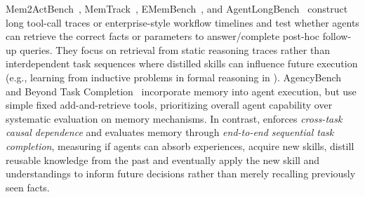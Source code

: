 Mem2ActBench~\citep{shen2026mem2actbench},  MemTrack~\citep{deshpande2025memtrack}, EMemBench~\citep{li2026emembench}, and AgentLongBench~\citep{fang2026agentlongbench} construct long tool-call traces or enterprise-style workflow timelines and test whether agents can retrieve the correct facts or parameters to answer/complete post-hoc follow-up queries. They focus on retrieval from static reasoning traces rather than interdependent task sequences where distilled skills can influence future execution (e.g., learning from inductive problems in formal reasoning in \ours). AgencyBench \citep{li2026agencybench} and Beyond Task Completion~\citep{akshathala2025beyond} incorporate memory into agent execution, but use simple fixed add-and-retrieve tools, prioritizing overall agent capability over systematic evaluation on memory mechanisms. 
In contrast, \ours enforces \textit{cross-task causal dependence} and evaluates memory through \textit{end-to-end sequential task completion}, measuring 
if agents can absorb experiences, acquire new skills, distill reusable knowledge from the past and eventually apply the new skill and understandings to inform future decisions rather than merely recalling previously seen facts.



